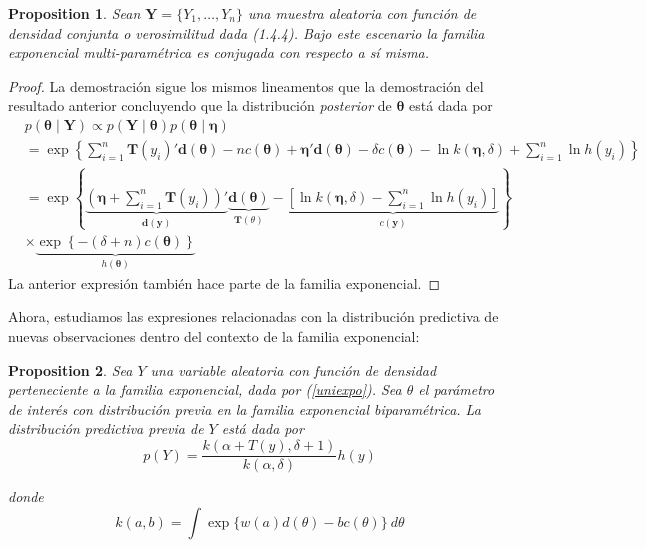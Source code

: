 \documentclass[
  spanish,
  letter]{book}
\newtheorem{proposition}{Proposition}[chapter]
\theoremstyle{definition}
\theoremstyle{definition}
\theoremstyle{definition}
\theoremstyle{remark}
\begin{document}
\begin{proposition}
\protect\hypertarget{prp:unnamed-chunk-23}{}{\label{prp:unnamed-chunk-23} }Sean \(\mathbf{Y}=\{Y_1, \ldots, Y_n\}\) una muestra aleatoria con función de densidad conjunta o verosimilitud dada (1.4.4). Bajo este escenario la familia exponencial multi-paramétrica es conjugada con respecto a sí misma.
\end{proposition}

\begin{proof}
\iffalse{} {Proof. } \fi{}La demostración sigue los mismos lineamentos que la demostración del resultado anterior concluyendo que la distribución \emph{posterior} de \(\boldsymbol \theta\) está dada por
\begin{align*}
&p(\boldsymbol \theta\mid \mathbf{Y}) \propto p(\mathbf{Y} \mid \boldsymbol \theta)p(\boldsymbol \theta\mid \boldsymbol \eta)\\
&= \exp\left\{\sum_{i=1}^n\mathbf{T}(y_i)'\mathbf{d}(\boldsymbol \theta) - nc(\boldsymbol \theta) + \boldsymbol \eta' \mathbf{d}(\boldsymbol \theta) - \delta c(\boldsymbol \theta) - \ln k(\boldsymbol \eta,\delta) +\sum_{i=1}^n\ln h(y_i)\right\}\\
& =\exp\left\{\underbrace{\left(\boldsymbol \eta+\sum_{i=1}^n\mathbf{T}(y_i)\right)'}_{\mathbf{d}(\mathbf{y})}
\underbrace{\mathbf{d}(\boldsymbol \theta)}_{\mathbf{T}(\theta)} - \underbrace{\left[\ln k(\boldsymbol \eta,\delta)-\sum_{i=1}^n\ln h(y_i)\right]}_{c(\mathbf{y})}\right\} \\
&  \times \underbrace{\exp\left\{-(\delta+n)c(\boldsymbol \theta)\right\}}_{h(\boldsymbol \theta)}
\end{align*}
La anterior expresión también hace parte de la familia exponencial.
\end{proof}

Ahora, estudiamos las expresiones relacionadas con la distribución predictiva de nuevas observaciones dentro del contexto de la familia exponencial:
\begin{proposition}
\protect\hypertarget{prp:unnamed-chunk-25}{}{\label{prp:unnamed-chunk-25} }Sea \(Y\) una variable aleatoria con función de densidad perteneciente a la familia exponencial, dada por (\ref{uniexpo}). Sea \(\theta\) el parámetro de interés con distribución \emph{previa} en la familia exponencial biparamétrica. La distribución predictiva \emph{previa} de \(Y\) está dada por
\begin{equation}
p(Y)=\frac{k(\alpha+T(y),\delta+1)}{k(\alpha,\delta)}h(y)
\end{equation}

donde
\begin{equation*}
k(a,b)=\int \exp\{w(a) d(\theta)-b c(\theta)\}\ d\theta
\end{equation*}
\end{proposition}
\end{document}
